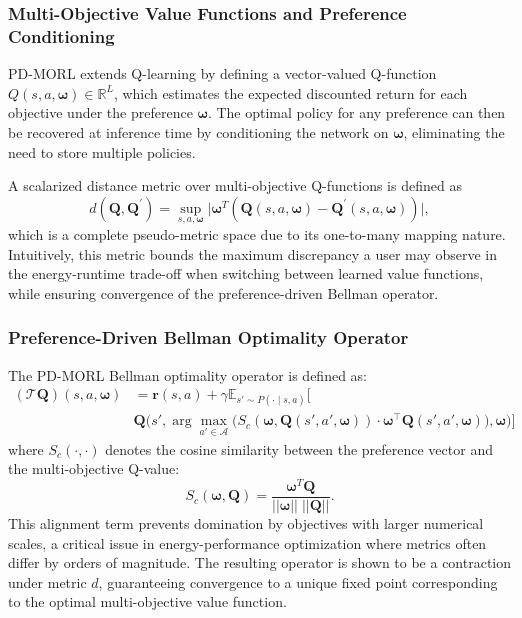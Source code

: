 \subsubsection{Multi-Objective Value Functions and Preference Conditioning}

PD-MORL extends Q-learning by defining a vector-valued Q-function $Q(s,a,\boldsymbol{\omega}) \in \mathbb{R}^L$, which estimates the expected discounted return for each objective under the preference $\boldsymbol{\omega}$. The optimal policy for any preference can then be recovered at inference time by conditioning the network on $\boldsymbol{\omega}$, eliminating the need to store multiple policies.

A scalarized distance metric over multi-objective Q-functions is 
defined as
\begin{equation}
    d(\mathbf{Q},\mathbf{Q}^{\prime}) = \sup_{s,a,\boldsymbol{\omega}} 
    \vert \boldsymbol{\omega}^{T}(\mathbf{Q}(s,a,\boldsymbol{\omega})
    -\mathbf{Q}^{\prime}(s,a,\boldsymbol{\omega}))\vert,
\end{equation}
which is a complete pseudo-metric space due to its one-to-many mapping nature. Intuitively, this metric bounds the maximum discrepancy a user may observe in the energy-runtime trade-off when switching between learned value functions, while ensuring convergence of the preference-driven Bellman operator.

\subsubsection{Preference-Driven Bellman Optimality Operator}

The PD-MORL Bellman optimality operator is defined as:
\begin{equation}
\begin{aligned}
(\mathcal{T}\mathbf{Q})(s,a,\boldsymbol{\omega})
&= \mathbf{r}(s,a)
+ \gamma \mathbb{E}_{s' \sim P(\cdot \mid s,a)} \Big[ \\
&\mathbf{Q}\!\Big(s',
\arg\max_{a' \in \mathcal{A}}
\big(S_c(\boldsymbol{\omega}, \mathbf{Q}(s',a',\boldsymbol{\omega}))
\cdot \boldsymbol{\omega}^{\top} \mathbf{Q}(s',a',\boldsymbol{\omega})
\big), \boldsymbol{\omega}\Big)\Big]
\end{aligned}
\label{eq:Bellman_equation}
\end{equation}
where $S_c(\cdot,\cdot)$ denotes the cosine similarity between the preference vector and the multi-objective Q-value:
\begin{equation}
    S_c(\boldsymbol{\omega},\mathbf{Q}) = 
    \frac{\boldsymbol{\omega}^T\mathbf{Q}}
    {\vert\vert \boldsymbol{\omega} \vert\vert \; 
    \vert\vert \mathbf{Q} \vert\vert}.
    \label{eq:cosine_function}
\end{equation}
This alignment term prevents domination by objectives with larger numerical scales, a critical issue in energy-performance optimization where metrics often differ by orders of magnitude. 
The resulting operator is shown to be a contraction under metric $d$, guaranteeing convergence to a unique fixed point corresponding to the optimal multi-objective value function.

